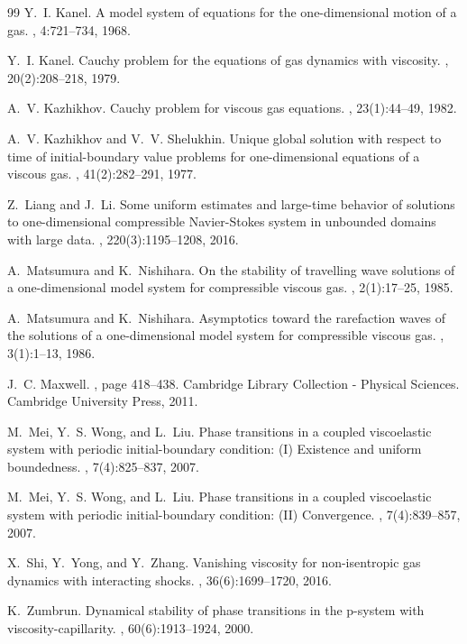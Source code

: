 \documentclass[a4paper,oneside,11pt]{article}
\numberwithin{equation}{section}
\begin{document}
\begin{thebibliography}{99}
Y.~I. Kanel.
\newblock A model system of equations for the one-dimensional motion of a gas.
, 4:721--734, 1968.

Y.~I. Kanel.
\newblock Cauchy problem for the equations of gas dynamics with viscosity.
, 20(2):208--218, 1979.

A.~V. Kazhikhov.
\newblock Cauchy problem for viscous gas equations.
, 23(1):44--49, 1982.

A.~V. Kazhikhov and V.~V. Shelukhin.
\newblock Unique global solution with respect to time of initial-boundary value
  problems for one-dimensional equations of a viscous gas.
, 41(2):282--291,
  1977.

Z.~Liang and J.~Li.
\newblock Some uniform estimates and large-time behavior of solutions to
  one-dimensional compressible {Navier-Stokes} system in unbounded domains with
  large data.
, 220(3):1195--1208, 2016.

A.~Matsumura and K.~Nishihara.
\newblock On the stability of travelling wave solutions of a one-dimensional
  model system for compressible viscous gas.
, 2(1):17--25, 1985.

A.~Matsumura and K.~Nishihara.
\newblock Asymptotics toward the rarefaction waves of the solutions of a
  one-dimensional model system for compressible viscous gas.
, 3(1):1--13, 1986.

J.~C. Maxwell.
, page 418–438.
\newblock Cambridge Library Collection - Physical Sciences. Cambridge
  University Press, 2011.

M.~Mei, Y.~S. Wong, and L.~Liu.
\newblock Phase transitions in a coupled viscoelastic system with periodic
  initial-boundary condition: {(I) E}xistence and uniform boundedness.
, 7(4):825--837, 2007.

M.~Mei, Y.~S. Wong, and L.~Liu.
\newblock Phase transitions in a coupled viscoelastic system with periodic
  initial-boundary condition: {(II) C}onvergence.
, 7(4):839--857, 2007.

X.~Shi, Y.~Yong, and Y.~Zhang.
\newblock Vanishing viscosity for non-isentropic gas dynamics with interacting
  shocks.
, 36(6):1699--1720, 2016.

K.~Zumbrun.
\newblock Dynamical stability of phase transitions in the p-system with
  viscosity-capillarity.
, 60(6):1913--1924, 2000.

\end{thebibliography}
\end{document}
